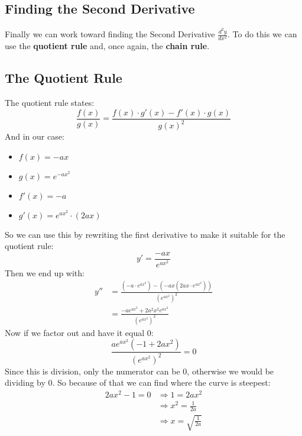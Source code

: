 \documentclass[a4paper,12pt]{article}
\begin{document}
\subsection{Finding the Second Derivative}
Finally we can work toward finding the Second Derivative $\frac{d^2y}{dx^2}$. 
To do this we can use the \textbf{quotient rule} and, once again, 
the \textbf{chain rule}.
%
\subsection*{The Quotient Rule}
The quotient rule states:
\begin{displaymath}
    \frac{f\left(x\right)}{g\left(x\right)} = %
    \frac{f\left(x\right) \cdot g'\left(x\right) - f'\left(x\right) 
    \cdot g\left(x\right)}{g\left(x\right)^2}
\end{displaymath}
And in our case:
\begin{itemize}
    \item $f\left(x\right) = -ax$ %
    \item $g\left(x\right) = e^{-ax^2}$
    \item $f'\left(x\right) = -a$
    \item $g'\left(x\right) = e^{ax^2} \cdot \left(2ax\right)$
\end{itemize}
So we can use this by rewriting the first derivative to make it suitable for 
the quotient rule:
\begin{displaymath}
    y' = \frac{-ax}{e^{ax^2}}
\end{displaymath}
Then we end up with:
\begin{equation}
    \begin{split} %
        y'' &= \frac{\left(-a \cdot e^{ax^2}\right) - 
        \left(-ax\left(2ax \cdot e^{ax^2}\right)\right)}
        {\left(e^{ax^2}\right)^2} \\ %
            &= \frac{-ae^{ax^2} + 2a^2x^2e^{ax^2}} %
            {\left(e^{ax^2}\right)^2}
    \end{split}
\end{equation}
Now if we factor out and have it equal $0$:
\begin{equation}
    \frac{ae^{ax^2}\left(-1+2ax^2\right)}
    {\left(e^{ax^2}\right)^2} = 0 %
\end{equation}
Since this is division, only the numerator can be $0$, 
otherwise we would be dividing by $0$. 
So because of that we can find where the curve is steepest:
\begin{displaymath}
    \begin{split} %
        2ax^2-1 = 0 &\Rightarrow 1 = 2ax^2 \\ %
                    &\Rightarrow x^2 = \frac{1}{2a} \\ %
                    &\Rightarrow x = \sqrt{\frac{1}{2a}}
    \end{split}
\end{displaymath}
%
\pagebreak
\end{document}
